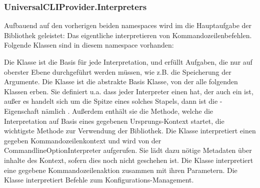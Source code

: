 \subsubsection{UniversalCLIProvider.Interpreters}
Aufbauend auf den vorherigen beiden namespaces wird im  die Hauptaufgabe der Bibliothek geleistet:
Das eigentliche interpretieren von Kommandozeilenbefehlen.
Folgende Klassen sind in diesem namespace vorhanden:
\begin{outline}
 \1 Die  Klasse ist die Basis für jede Interpretation, und erfüllt Aufgaben, die nur auf oberster Ebene durchgeführt werden müssen, wie z.B. die Speicherung der Argumente.
 \1 Die  Klasse ist die abstrakte Basis Klasse, von der alle folgenden Klassen erben.
 Sie definiert u.a. dass jeder Interpreter einen  hat, der auch ein  ist, au\ss er es handelt sich um die Spitze eines solches Stapels,
 dann ist die -Eigenschaft nämlich .
 Au\ss erdem enthält sie die  Methode, welche die Interpretation auf Basis eines gegebenen Ursprungs-Kontext startet, die wichtigste Methode zur Verwendung der Bibliothek.
 \1 Die  Klasse interpretiert einen gegeben Kommandozeilenkontext und wird von der CommandlineOptionInterpreter aufgerufen.
 Sie lädt dazu nötige Metadaten über inhalte des Kontext, sofern dies noch nicht geschehen ist.
 \1 Die  Klasse interpretiert eine gegebene Kommandozeilenaktion zusammen mit ihren Parametern.
 \1 Die  Klasse interpretiert Befehle zum Konfigurations-Management.
\end{outline}
